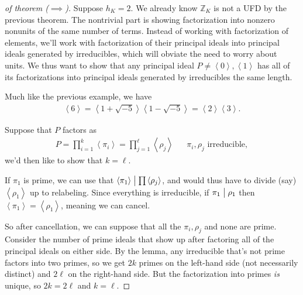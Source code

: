 \begin{proof}[of theorem ($\implies$)]

Suppose \(h_K = 2\). We already know \({\mathbb{Z}}_K\) is not a UFD by
the previous theorem. The nontrivial part is showing factorization into
nonzero nonunits of the same number of terms. Instead of working with
factorization of elements, we'll work with factorization of their
principal ideals into principal ideals generated by irreducibles, which
will obviate the need to worry about units. We thus want to show that
any principal ideal
\(P \neq \left\langle{ 0 }\right\rangle, \left\langle{ 1 }\right\rangle\)
has all of its factorizations into principal ideals generated by
irreducibles the same length.

\begin{example}[?]

Much like the previous example, we have
\begin{align*}
\left\langle{ 6 }\right\rangle = \left\langle{ 1 + \sqrt{-5} }\right\rangle \left\langle{ 1 - \sqrt{-5} }\right\rangle = \left\langle{ 2 }\right\rangle \left\langle{ 3 }\right\rangle     
.\end{align*}

\end{example}

Suppose that \(P\) factors as
\begin{align*}
P = 
\prod_{i=1}^k \left\langle{ \pi_i }\right\rangle
=
\prod_{j=1}^\ell \left\langle{ \rho_j }\right\rangle
&&
\pi_i, \rho_j \text{ irreducible}
,\end{align*}
we'd then like to show that \(k=\ell\).

\begin{observation}

If \(\pi_1\) is prime, we can use that
\(\left\langle{ \pi_1 }\right\rangle\bigm|\prod \left\langle{ \rho_j }\right\rangle\),
and would thus have to divide (say)
\(\left\langle{ \rho_1 }\right\rangle\) up to relabeling. Since
everything is irreducible, if \(\pi_1 \bigm|\rho_1\) then
\(\left\langle{ \pi_1 }\right\rangle= \left\langle{ \rho_1 }\right\rangle\),
meaning we can cancel.

\end{observation}

So after cancellation, we can suppose that all the \(\pi_i, \rho_j\) and
none are prime. Consider the number of prime ideals that show up after
factoring all of the principal ideals on either side. By the lemma, any
irreducible that's not prime factors into two primes, so we get \(2k\)
primes on the left-hand side (not necessarily distinct) and \(2\ell\) on
the right-hand side. But the factorization into primes \emph{is} unique,
so \(2k=2\ell\) and \(k=\ell\).

\end{proof}

